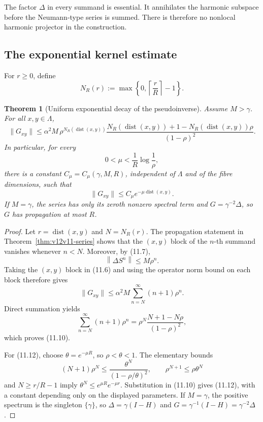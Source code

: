 \documentclass[11pt]{article}
\newtheorem{theorem}{Theorem}[section]
\theoremstyle{remark}
\begin{document}
The factor \(\Delta\) in every summand is essential.  It annihilates
the harmonic subspace before the Neumann-type series is summed.
There is therefore no nonlocal harmonic projector in the
construction.

\subsection{The exponential kernel estimate}

For \(r\ge0\), define
\[
 N_R(r):=\max\left\{0,\left\lceil\frac rR\right\rceil-1\right\}.
                                                               \tag{11.9}
\]

\begin{theorem}[Uniform exponential decay of the pseudoinverse]
\label{thm:v12v11-decay}
Assume \(M>\gamma\).  For all \(x,y\in\Lambda\),
\[
 \boxed{
 \|G_{xy}\|
 \le
 \alpha^2M\,
 \rho^{N_R(\operatorname{dist}(x,y))}
 \frac{N_R(\operatorname{dist}(x,y))+1
       -N_R(\operatorname{dist}(x,y))\rho}
      {(1-\rho)^2}.}                                        \tag{11.10}
\]
In particular, for every
\[
             0<\mu<\frac1R\log\frac1\rho,                   \tag{11.11}
\]
there is a constant \(C_{\mu}=C_{\mu}(\gamma,M,R)\), independent of
\(\Lambda\) and of the fibre dimensions, such that
\[
                         \|G_{xy}\|
 \le C_{\mu}e^{-\mu\operatorname{dist}(x,y)}.                \tag{11.12}
\]
If \(M=\gamma\), the series has only its zeroth nonzero spectral
term and \(G=\gamma^{-2}\Delta\), so \(G\) has propagation at most
\(R\).
\end{theorem}

\begin{proof}
Let \(r=\operatorname{dist}(x,y)\) and \(N=N_R(r)\).  The propagation
statement in Theorem~\ref{thm:v12v11-series} shows that the
\((x,y)\) block of the \(n\)-th summand vanishes whenever \(n<N\).
Moreover, by (11.7),
\[
 \left\|\Delta S^n\right\|
 \le M\rho^n.                                                \tag{11.13}
\]
Taking the \((x,y)\) block in (11.6) and using the operator norm bound
on each block therefore gives
\[
 \|G_{xy}\|
 \le\alpha^2M\sum_{n=N}^{\infty}(n+1)\rho^n.                \tag{11.14}
\]
Direct summation yields
\[
 \sum_{n=N}^{\infty}(n+1)\rho^n
 =
 \rho^N\frac{N+1-N\rho}{(1-\rho)^2},                        \tag{11.15}
\]
which proves (11.10).

For (11.12), choose
\(\theta=e^{-\mu R}\), so \(\rho<\theta<1\).  The elementary bounds
\[
 (N+1)\rho^N
 \le\frac{\theta^N}{(1-\rho/\theta)^2},
 \qquad
 \rho^{N+1}\le\rho\theta^N                                  \tag{11.16}
\]
and \(N\ge r/R-1\) imply
\(\theta^N\le e^{\mu R}e^{-\mu r}\).  Substitution in
(11.10) gives (11.12), with a constant depending only on the
displayed parameters.  If \(M=\gamma\), the positive spectrum is
the singleton \(\{\gamma\}\), so
\(\Delta=\gamma(I-H)\) and
\(G=\gamma^{-1}(I-H)=\gamma^{-2}\Delta\).
\end{proof}
\end{document}
